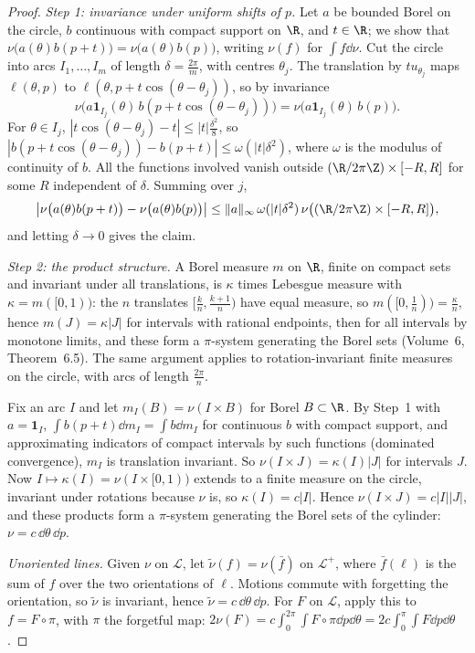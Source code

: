 \begin{proof}
\emph{Step 1: invariance under uniform shifts of $p$.} Let $a$ be bounded Borel on the circle, $b$ continuous with compact support on $\R$, and $t\in\R$; we show that
$\nu\bigl(a(\theta)b(p+t)\bigr)=\nu\bigl(a(\theta)b(p)\bigr)$, writing $\nu(f)$ for $\int f\dd\nu$. Cut the circle into arcs $I_1,\dots,I_m$ of length $\delta=\frac{2\pi}m$, with centres $\theta_j$. The translation by
$tu_{\theta_j}$ maps $\ell(\theta,p)$ to $\ell(\theta,p+t\cos(\theta-\theta_j))$, so by invariance
\[\nu\bigl(a\mathbf 1_{I_j}(\theta)\,b(p+t\cos(\theta-\theta_j))\bigr)=\nu\bigl(a\mathbf 1_{I_j}(\theta)\,b(p)\bigr).\]
For $\theta\in I_j$, $|t\cos(\theta-\theta_j)-t|\le|t|\frac{\delta^2}8$, so $|b(p+t\cos(\theta-\theta_j))-b(p+t)|\le\omega(|t|\delta^2)$, where $\omega$ is the modulus of continuity of $b$. All the functions involved vanish
outside $(\R/2\pi\Z)\times[-R,R]$ for some $R$ independent of $\delta$. Summing over $j$,
\[\bigl|\nu\bigl(a(\theta)b(p+t)\bigr)-\nu\bigl(a(\theta)b(p)\bigr)\bigr|\le\|a\|_\infty\,\omega(|t|\delta^2)\,\nu\bigl((\R/2\pi\Z)\times[-R,R]\bigr),\]
and letting $\delta\to0$ gives the claim.

\emph{Step 2: the product structure.} A Borel measure $m$ on $\R$, finite on compact sets and invariant under all translations, is $\kappa$ times Lebesgue measure with $\kappa=m([0,1))$: the $n$ translates
$[\frac kn,\frac{k+1}n)$ have equal measure, so $m([0,\frac1n))=\frac\kappa n$, hence $m(J)=\kappa|J|$ for intervals with rational endpoints, then for all intervals by monotone limits, and these form a $\pi$-system
generating the Borel sets (Volume~6, Theorem~6.5). The same argument applies to rotation-invariant finite measures on the circle, with arcs of length $\frac{2\pi}n$.

Fix an arc $I$ and let $m_I(B)=\nu(I\times B)$ for Borel $B\subset\R$. By Step~1 with $a=\mathbf 1_I$, $\int b(p+t)\dd m_I=\int b\dd m_I$ for continuous $b$ with compact support, and approximating indicators of compact intervals by
such functions (dominated convergence), $m_I$ is translation invariant. So $\nu(I\times J)=\kappa(I)|J|$ for intervals $J$. Now $I\mapsto\kappa(I)=\nu(I\times[0,1))$ extends to a finite measure on the circle, invariant under
rotations because $\nu$ is, so $\kappa(I)=c|I|$. Hence $\nu(I\times J)=c|I||J|$, and these products form a $\pi$-system generating the Borel sets of the cylinder: $\nu=c\,\dd\theta\,\dd p$.

\emph{Unoriented lines.} Given $\nu$ on $\mathcal L$, let $\tilde\nu(f)=\nu(\bar f)$ on $\mathcal L^+$, where $\bar f(\ell)$ is the sum of $f$ over the two orientations of $\ell$. Motions commute with forgetting the
orientation, so $\tilde\nu$ is invariant, hence $\tilde\nu=c\,\dd\theta\,\dd p$. For $F$ on $\mathcal L$, apply this to $f=F\circ\pi$, with $\pi$ the forgetful map: $2\nu(F)=c\int_0^{2\pi}\!\!\int F\circ\pi\dd p\dd\theta=2c\int_0^\pi\!\!\int F\dd p\dd\theta$.
\end{proof}


